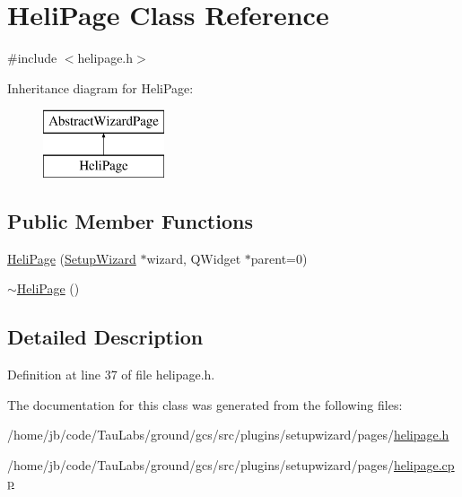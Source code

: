 \hypertarget{class_heli_page}{\section{\-Heli\-Page \-Class \-Reference}
\label{class_heli_page}
}


{\ttfamily \#include $<$helipage.\-h$>$}

\-Inheritance diagram for \-Heli\-Page\-:\begin{figure}[H]
\begin{center}
\leavevmode
\includegraphics[height=2.000000cm]{class_heli_page}
\end{center}
\end{figure}
\subsection*{\-Public \-Member \-Functions}
\begin{DoxyCompactItemize}
\item 
\hyperlink{group___heli_page_ga894cc849703e9f7ead7dc27b2107c325}{\-Heli\-Page} (\hyperlink{class_setup_wizard}{\-Setup\-Wizard} $\ast$wizard, \-Q\-Widget $\ast$parent=0)
\item 
\hyperlink{group___heli_page_ga63708ecb9592a865a1927e399656a3f9}{$\sim$\-Heli\-Page} ()
\end{DoxyCompactItemize}


\subsection{\-Detailed \-Description}


\-Definition at line 37 of file helipage.\-h.



\-The documentation for this class was generated from the following files\-:\begin{DoxyCompactItemize}
\item 
/home/jb/code/\-Tau\-Labs/ground/gcs/src/plugins/setupwizard/pages/\hyperlink{helipage_8h}{helipage.\-h}\item 
/home/jb/code/\-Tau\-Labs/ground/gcs/src/plugins/setupwizard/pages/\hyperlink{helipage_8cpp}{helipage.\-cpp}\end{DoxyCompactItemize}
